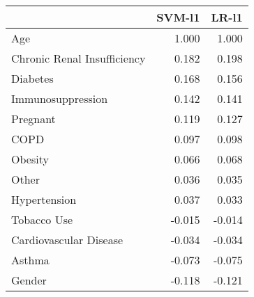 \begin{tabular}{lrr}
\toprule
{} &  SVM-l1 &  LR-l1 \\
\midrule
Age                         &   1.000 &  1.000 \\
Chronic Renal Insufficiency &   0.182 &  0.198 \\
Diabetes                    &   0.168 &  0.156 \\
Immunosuppression           &   0.142 &  0.141 \\
Pregnant                    &   0.119 &  0.127 \\
COPD                        &   0.097 &  0.098 \\
Obesity                     &   0.066 &  0.068 \\
Other                       &   0.036 &  0.035 \\
Hypertension                &   0.037 &  0.033 \\
Tobacco Use                 &  -0.015 & -0.014 \\
Cardiovascular Disease      &  -0.034 & -0.034 \\
Asthma                      &  -0.073 & -0.075 \\
Gender                      &  -0.118 & -0.121 \\
\bottomrule
\end{tabular}

